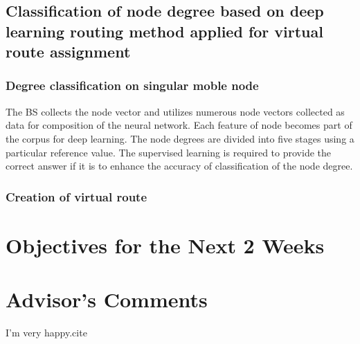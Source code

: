 \documentclass[11pt]{report}
\begin{document}
	\subsection{Classification of node degree based on deep learning routing method applied for virtual route assignment}
	
	\subsubsection{Degree classification on singular moble node}
	The BS collects the node vector and utilizes numerous node vectors collected as data for composition of the neural network. Each feature of node becomes part of the corpus for deep learning. The node degrees are divided into five stages using a particular reference value. The supervised learning is required to provide the correct answer if it is to enhance the accuracy of classification of the node degree. 
	\subsubsection{Creation of virtual route}
	  
	
	\section{Objectives for the Next 2 Weeks}
	
	
	\section{Advisor's Comments}
	

	I'm very happy.cite \cite{IEEEexample:IEEEwebsite}
	
	
	
	
\end{document}
